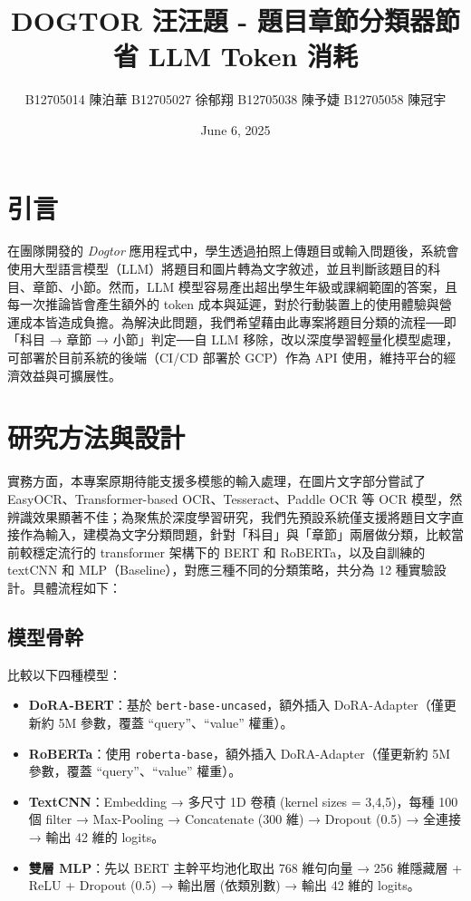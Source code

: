 \documentclass[10pt]{article}
\title{DOGTOR 汪汪題 - 題目章節分類器節省 LLM Token 消耗}
\author{B12705014 陳泊華 \quad B12705027 徐郁翔 \quad B12705038 陳予婕 \quad B12705058 陳冠宇}
\date{June 6, 2025}
\begin{document}
\begin{CJK}{UTF8}{bsmi}
\maketitle


\section{引言}
在團隊開發的 \textit{Dogtor} 應用程式中，學生透過拍照上傳題目或輸入問題後，系統會使用大型語言模型（LLM）將題目和圖片轉為文字敘述，並且判斷該題目的科目、章節、小節。然而，LLM 模型容易產出超出學生年級或課綱範圍的答案，且每一次推論皆會產生額外的 token 成本與延遲，對於行動裝置上的使用體驗與營運成本皆造成負擔。為解決此問題，我們希望藉由此專案將題目分類的流程──即「科目 → 章節 → 小節」判定──自 LLM 移除，改以深度學習輕量化模型處理，可部署於目前系統的後端（CI/CD 部署於 GCP）作為 API 使用，維持平台的經濟效益與可擴展性。

\section{研究方法與設計}
實務方面，本專案原期待能支援多模態的輸入處理，在圖片文字部分嘗試了 EasyOCR、Transformer-based OCR、Tesseract、Paddle OCR 等 OCR 模型，然辨識效果顯著不佳；為聚焦於深度學習研究，我們先預設系統僅支援將題目文字直接作為輸入，建模為文字分類問題，針對「科目」與「章節」兩層做分類，比較當前較穩定流行的 transformer 架構下的 BERT 和 RoBERTa，以及自訓練的 textCNN 和 MLP（Baseline），對應三種不同的分類策略，共分為 12 種實驗設計。具體流程如下：

\subsection{模型骨幹}
比較以下四種模型：
\begin{itemize}
  \item \textbf{DoRA-BERT}：基於 \texttt{bert-base-uncased}，額外插入 DoRA-Adapter（僅更新約 5M 參數，覆蓋 “query”、“value” 權重）。  
  \item \textbf{RoBERTa}：使用 \texttt{roberta-base}，額外插入 DoRA-Adapter（僅更新約 5M 參數，覆蓋 “query”、“value” 權重）。 
  \item \textbf{TextCNN}：Embedding → 多尺寸 1D 卷積 (kernel sizes = 3,4,5)，每種 100 個 filter → Max-Pooling → Concatenate (300 維) → Dropout (0.5) → 全連接 → 輸出 42 維的 logits。  
  \item \textbf{雙層 MLP}：先以 BERT 主幹平均池化取出 768 維句向量 → 256 維隱藏層 + ReLU + Dropout (0.5) → 輸出層 (依類別數) → 輸出 42 維的 logits。  
\end{itemize}


\end{CJK}
\end{document}
